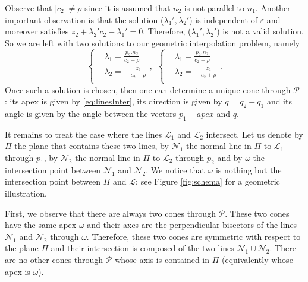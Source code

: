 \documentclass[5p]{elsarticle}
\newcommand\Pc{\mathcal P}
\def\Lc{{\mathcal{L}}}
\def\Nc{{\mathcal{N}}}
\newcommand{\com}[1]{{\color{black} #1}}
\begin{document}
Observe that $|c_2|\neq \rho$ since it is assumed that $n_2$ is not parallel to $n_1$. Another important observation is that the solution ($\lambda_1',\lambda_2'$) is independent of $\varepsilon$ and  moreover satisfies $z_2+\lambda_2'c_2-\lambda_1'=0$. Therefore, \com{($\lambda_1',\lambda_2'$)} is not a valid solution. \com{So we} are left with two solutions to our geometric interpolation problem, namely 
 \begin{equation}\label{eq:conemixedsol}
   \left\{
   \begin{aligned}
   &\lambda_1 = \frac{p_2.n_2}{c_2 - \rho}\\
   &\lambda_2 = - \frac{z_2}{c_2 - \rho }\\
   \end{aligned}
   \right., \ \
   \left\{
   \begin{aligned}
   &\lambda_1 = \frac{p_2.n_2}{c_2 +  \rho}\\
   &\lambda_2 = - \frac{z_2}{c_2 + \rho }\\
   \end{aligned}
   \right..
 \end{equation}
Once such a solution is chosen, then one can determine a unique cone through $\Pc$ : its apex is given by \eqref{eq:linesInter}, its direction is given by $q=q_2-q_1$ and its angle is given by the angle between the vectors $p_1-apex$ and $q$.



\medskip

It remains to treat the case where the lines $\Lc_1$ and $\Lc_2$ intersect. Let us denote by $\Pi$ the plane that contains these two lines, by $\Nc_1$ the normal line in $\Pi$ to $\Lc_1$ through $p_1$, by $\Nc_2$ the normal line in $\Pi$ to $\Lc_2$ through $p_2$ and by $\omega$ the intersection point between $\Nc_1$ and $\Nc_2$. We notice that $\omega$ is nothing but the intersection point between $\Pi$ and $\Lc$; see Figure \ref{fig:schema} for a geometric illustration.

First, we observe that there are always two cones throu\-gh $\Pc$. These two cones have the same apex $\omega$ and their \com{axes} are the perpendicular bisectors of the lines $\Nc_1$ and $\Nc_2$ through $\omega$. Therefore, these two cones are symmetric with respect to the plane $\Pi$ and their intersection is composed of the two lines $\Nc_1\cup \Nc_2$. \com{There are} no other cones through $\Pc$ \com{whose} axis is contained in $\Pi$ (equivalently whose apex is $\omega$).
\end{document}
